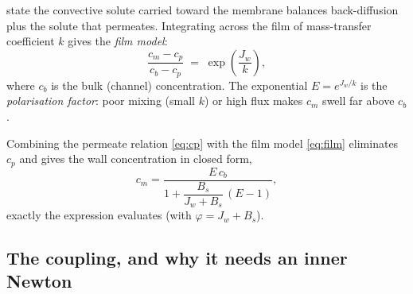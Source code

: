 \documentclass[11pt,a4paper]{article}
\begin{document}
state the convective solute carried toward the membrane balances
back-diffusion plus the solute that permeates.  Integrating across the
film of mass-transfer coefficient $k$ gives the \emph{film model}:
\begin{equation}
   \frac{c_m - c_p}{c_b - c_p} \;=\; \exp\!\left(\frac{J_w}{k}\right),
   \label{eq:film}
\end{equation}
where $c_b$ is the bulk (channel) concentration.  The exponential
$E=e^{J_w/k}$ is the \emph{polarisation factor}: poor mixing (small
$k$) or high flux makes $c_m$ swell far above $c_b$.

Combining the permeate relation \eqref{eq:cp} with the film model
\eqref{eq:film} eliminates $c_p$ and gives the wall concentration in
closed form,
\begin{equation}
   c_m = \frac{E\,c_b}{1 + \dfrac{B_s}{J_w+B_s}\,(E-1)},
   \label{eq:cm-closed}
\end{equation}
exactly the expression  evaluates (with $\varphi =
J_w + B_s$).

\subsection{The coupling, and why it needs an inner Newton}
\end{document}
